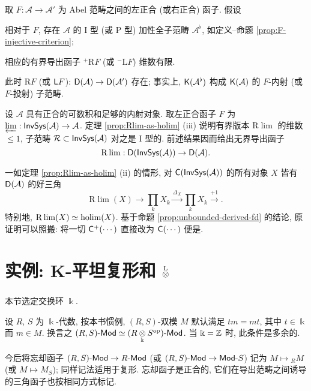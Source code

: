 \begin{proposition}\label{prop:unbounded-derived-fd}
	取 $F: \mathcal{A} \to \mathcal{A}'$ 为 Abel 范畴之间的左正合 (或右正合) 函子. 假设
	\begin{compactitem}
		\item 相对于 $F$, 存在 $\mathcal{A}$ 的 I 型 (或 P 型) 加性全子范畴 $\mathcal{A}^\flat$, 如定义--命题 \ref{prop:F-injective-criterion};
		\item 相应的有界导出函子 ${}^+ \mathrm{R}F$ (或 ${}^- \mathrm{L}F$) 维数有限.
	\end{compactitem}
	此时 $\mathrm{R}F$ (或 $\mathsf{L}F$): $\mathsf{D}(\mathcal{A}) \to \mathsf{D}(\mathcal{A}')$ 存在; 事实上, $\mathsf{K}(\mathcal{A}^\flat)$ 构成 $\mathsf{K}(\mathcal{A})$ 的 $F$-内射 (或 $F$-投射) 子范畴.
\end{proposition}

\begin{example}\label{eg:Rlim-unbounded}
	设 $\mathcal{A}$ 具有正合的可数积和足够的内射对象. 取左正合函子 $F$ 为 $\varprojlim: \mathsf{InvSys}(\mathcal{A}) \to \mathcal{A}$. 定理 \ref{prop:Rlim-as-holim} (iii) 说明有界版本 $\mathrm{R}\lim$ 的维数 $\leq 1$, 子范畴 $\mathcal{R} \subset \mathsf{InvSys}(\mathcal{A})$ 对之是 I 型的. 前述结果因而给出无界导出函子
	\[ \mathrm{R}\lim: \mathsf{D}(\mathsf{InvSys}(\mathcal{A})) \to \mathsf{D}(\mathcal{A}). \]
	
	一如定理 \ref{prop:Rlim-as-holim} (ii) 的情形, 对 $\mathsf{C}(\mathsf{InvSys}(\mathcal{A}))$ 的所有对象 $X$ 皆有 $\mathsf{D}(\mathcal{A})$ 的好三角
	\[ \mathrm{R}\lim(X) \to \prod_k X_k \xrightarrow{\Delta_X} \prod_k X_k \xrightarrow{+1} . \]
	特别地, $\mathrm{R}\lim(X) \simeq \operatorname{holim}(X)$. 基于命题 \ref{prop:unbounded-derived-fd} 的结论, 原证明可以照搬: 将一切 $\mathsf{C}^+(\cdots)$ 直接改为 $\mathsf{C}(\cdots)$ 便是.
\end{example}

\section{实例: K-平坦复形和 \texorpdfstring{$\underset{}{\overset{\mathrm{L}}{\otimes}}$}{otimesL}}\label{sec:otimesL}
本节选定交换环 $\Bbbk$.

\begin{convention}\label{con:bimodule-algebra}
	设 $R$, $S$ 为 $\Bbbk$-代数, 按本书惯例, $(R,S)$-双模 $M$ 默认满足 $tm = mt$, 其中 $t \in \Bbbk$ 而 $m \in M$. 换言之 $(R,S)\text{-}\mathsf{Mod} \simeq (R \underset{\Bbbk}{\otimes} S^{\operatorname{op}})\text{-}\mathsf{Mod}$. 当 $\Bbbk = \mathbb{Z}$ 时, 此条件是多余的.
	
	今后将忘却函子 $(R,S)\text{-}\mathsf{Mod} \to R\text{-}\mathsf{Mod}$ (或 $(R,S)\text{-}\mathsf{Mod} \to \mathsf{Mod}\text{-}S$) 记为 $M \mapsto {}_R M$ (或 $M \mapsto M_S$); 同样记法适用于复形. 忘却函子是正合的, 它们在导出范畴之间诱导的三角函子也按相同方式标记.
\end{convention}

